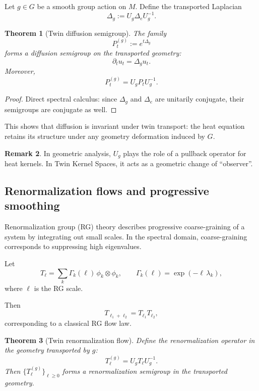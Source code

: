 \documentclass[11pt]{article}
\newtheorem{theorem}{Theorem}[section]
\theoremstyle{definition}
\newtheorem{remark}[theorem]{Remark}
\begin{document}
Let $g\in G$ be a smooth group action on $M$.
Define the transported Laplacian
\[
\Delta_g := U_g \Delta_e U_g^{-1}.
\]

\begin{theorem}[Twin diffusion semigroup]
	The family
	\[
	P_t^{(g)} := e^{t\Delta_g}
	\]
	forms a diffusion semigroup on the transported geometry:
	\[
	\partial_t u_t = \Delta_g u_t.
	\]
	Moreover,
	\[
	P_t^{(g)} = U_g P_t U_g^{-1}.
	\]
\end{theorem}

\begin{proof}
	Direct spectral calculus: since $\Delta_g$ and $\Delta_e$ are unitarily conjugate, their semigroups are conjugate as well.
\end{proof}

This shows that diffusion is invariant under twin transport: the heat equation retains its structure under any geometry deformation induced by $G$.

\begin{remark}
	In geometric analysis, $U_g$ plays the role of a pullback operator for heat kernels.
	In Twin Kernel Spaces, it acts as a geometric change of “observer”.
\end{remark}

\subsection{Renormalization flows and progressive smoothing}

Renormalization group (RG) theory describes progressive coarse-graining of a system by integrating out small scales.
In the spectral domain, coarse-graining corresponds to suppressing high eigenvalues.

Let
\[
T_\ell = \sum_k \Gamma_k(\ell)\,\phi_k\otimes \phi_k,
\qquad
\Gamma_k(\ell) = \exp(-\ell\,\lambda_k),
\]
where $\ell$ is the RG scale.

Then
\[
T_{\ell_1+\ell_2} = T_{\ell_1}T_{\ell_2},
\]
corresponding to a classical RG flow law.

\begin{theorem}[Twin renormalization flow]
	Define the renormalization operator in the geometry transported by $g$:
	\[
	T_\ell^{(g)} = U_g T_\ell U_g^{-1}.
	\]
	Then $\{T_\ell^{(g)}\}_{\ell\ge 0}$ forms a renormalization semigroup in the transported geometry.
\end{theorem}
\end{document}
